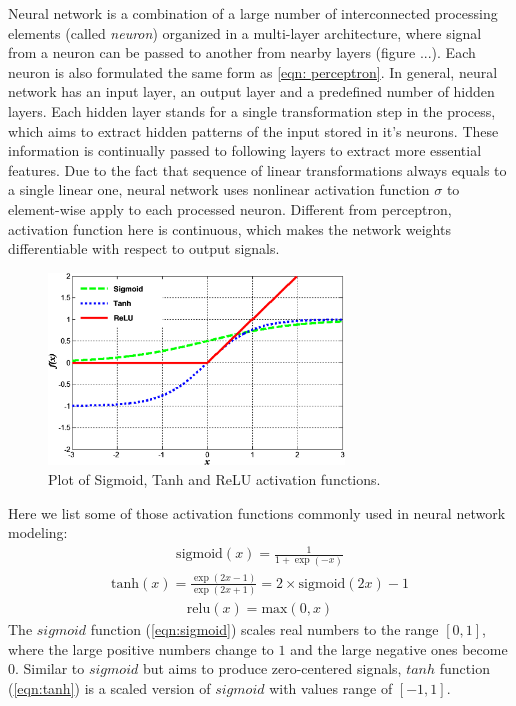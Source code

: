 Neural network is a combination of a large number of interconnected processing elements (called \textit{neuron}) organized in a multi-layer architecture, where signal from a neuron can be passed to another from nearby layers (figure ...).
Each neuron is also formulated the same form as \ref{eqn: perceptron}. 
In general, neural network has an input layer, an output layer and a predefined number of hidden layers. 
Each hidden layer stands for a single transformation step in the process, which aims to extract hidden patterns of the input stored in it's neurons. These information is continually passed to following layers to extract more essential features. 
Due to the fact that sequence of linear transformations always equals to a single linear one, neural network uses nonlinear activation function $\sigma$ to element-wise apply to each processed neuron. 
Different from perceptron, activation function here is continuous, which makes the network weights differentiable with respect to output signals. \\
\begin{figure}[t!]
    \centering
    \includegraphics[width=0.7\textwidth]{resources/images/activation.png}
    \caption{Plot of Sigmoid, Tanh and ReLU activation functions.}
    \label{fig:activation}
\end{figure}
Here we list some of those activation functions commonly used in neural network modeling:
\begin{align} \label{eqn:sigmoid}
    \mathrm{sigmoid}(x) = \frac{1}{1 + \exp(-x)}
\end{align}
\begin{align} \label{eqn:tanh}
    \mathrm{tanh}(x) = \frac{\exp(2x - 1)}{\exp(2x + 1)} = 2 \times \mathrm{sigmoid}(2x) - 1
\end{align}
\begin{align} \label{eqn:relu}
    \mathrm{relu}(x) = \mathrm{max}(0, x)
\end{align}
The $sigmoid$ function (\ref{eqn:sigmoid}) scales real numbers to the range $[0, 1]$, where the large positive numbers change to $1$ and the large negative ones become $0$. Similar to $sigmoid$ but aims to produce zero-centered signals, $tanh$ function (\ref{eqn:tanh}) is a scaled version of $sigmoid$ with values range of $[-1, 1]$.\\
